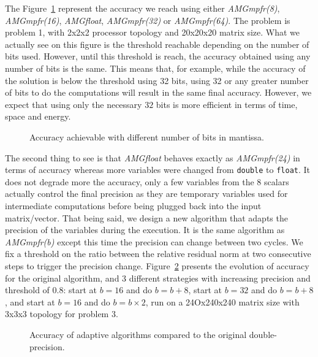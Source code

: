 \documentclass[a4paper,10pt]{article}
\begin{document}
   The Figure~\ref{fig.bits_accuracy} represent the accuracy we reach using either \emph{AMGmpfr(8)}, \emph{AMGmpfr(16)}, \emph{AMGfloat}, \emph{AMGmpfr(32)} or \emph{AMGmpfr(64)}. The problem is problem 1, with 2x2x2 processor topology and 20x20x20 matrix size.
   What we actually see on this figure is the threshold reachable depending on the number of bits used. However, until this threshold is reach, the accuracy obtained using any number of bits is the same. This means that, for example,
   while the accuracy of the solution is below the threshold using 32 bits, using 32 or any greater number of bits to do the computations will result in the same final accuracy. However, we expect that using only the necessary $32$ bits is 
   more efficient in terms of time, space and energy.
   
   \begin{figure}
    \caption{Accuracy achievable with different number of bits in mantissa.}
    \label{fig.bits_accuracy}
   \end{figure}
   
   The second thing to see is that \emph{AMGfloat} behaves exactly as \emph{AMGmpfr(24)} in terms of accuracy whereas more variables were changed from \texttt{double} to \texttt{float}. It does not degrade more the accuracy, only a few variables
   from the 8 scalars actually control the final precision as they are temporary variables used for intermediate computations before being plugged back into the input matrix/vector.
   That being said, we design a new algorithm that adapts the precision of the variables during the execution. It is the same algorithm as \emph{AMGmpfr(b)} except this time the precision can change between two cycles.
   We fix a threshold on the ratio between the relative residual norm at two consecutive steps to trigger the precision change.
   Figure~\ref{fig.prec_incr} presents the evolution of accuracy for the original algorithm, and 3 different strategies with increasing precision and threshold of 0.8: start at $b=16$ and do $b=b+8$, start at $b=32$
   and do $b=b+8$, and start at $b=16$ and do $b=b\times2$, run on a 24Ox240x240 matrix size with 3x3x3 topology for problem 3.
   
   \begin{figure}
    \caption{Accuracy of adaptive algorithms compared to the original double-precision.}
    \label{fig.prec_incr}
   \end{figure}
   
\end{document}
